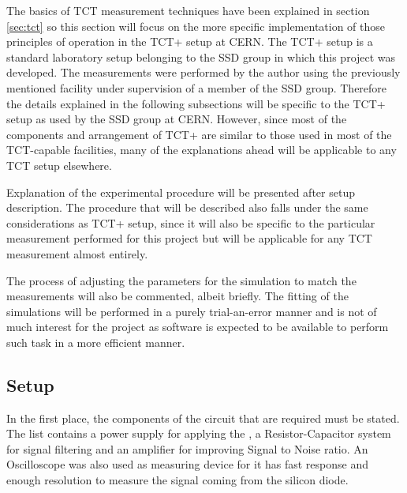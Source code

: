 The basics of TCT measurement techniques have been explained in section \ref{sec:tct} so this section will focus on the more specific implementation of those principles of operation in the TCT+ setup at CERN. The TCT+ setup is a standard laboratory setup belonging to the SSD group in which this project was developed. The measurements were performed by the author using the previously mentioned facility under supervision of a member of the SSD group. Therefore the details explained in the following subsections will be specific to the TCT+ setup as used by the SSD group at CERN. However, since most of the components and arrangement of TCT+ are similar to those used in most of the TCT-capable facilities, many of the explanations ahead will be applicable to any TCT setup elsewhere. 

Explanation of the experimental procedure will be presented after setup description. The procedure that will be described also falls under the same considerations as TCT+ setup, since it will also be specific to the particular measurement performed for this project but will be applicable for any TCT measurement almost entirely. 

The process of adjusting the parameters for the simulation to match the measurements will also be commented, albeit briefly. The fitting of the simulations will be performed in a purely trial-an-error manner and is not of much interest for the project as software is expected to be available to perform such task in a more efficient manner. 


\subsection{Setup} %

In the first place, the components of the circuit that are required must be stated. The list contains a power supply for applying the \vias, a Resistor-Capacitor system for signal filtering and an amplifier for improving Signal to Noise ratio. An Oscilloscope was also used as measuring device for it has fast response and enough resolution to measure the signal coming from the silicon diode.

